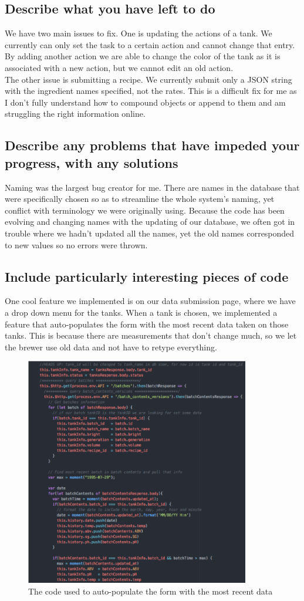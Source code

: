 \documentclass[draftclsnofoot,onecolumn,letterpaper,10pt,compsoc]{IEEEtran}
\begin{document}
\subsection{Describe what you have left to do}
We have two main issues to fix. One is updating the actions of a tank.
We currently can only set the task to a certain action and cannot change that entry.
By adding another action we are able to change the color of the tank as it is associated with a new action, but we cannot edit an old action.
\\
The other issue is submitting a recipe.
We currently submit only a JSON string with the ingredient names specified, not the rates.
This is a difficult fix for me as I don't fully understand how to compound objects or append to them and am struggling the right information online.
\subsection{Describe any problems that have impeded your progress, with any solutions}
Naming was the largest bug creator for me.
There are names in the database that were specifically chosen so as to streamline the whole system's naming, yet conflict with terminology we were originally using.
Because the code has been evolving and changing names with the updating of our database, we often got in trouble where we hadn't updated all the names, yet the old names corresponded to new values so no errors were thrown.
\subsection{Include particularly interesting pieces of code}
One cool feature we implemented is on our data submission page, where we have a drop down menu for the tanks.
When a tank is chosen, we implemented a feature that auto-populates the form with the most recent data taken on those tanks.
This is because there are measurements that don't change much, so we let the brewer use old data and not have to retype everything.
\begin{figure}
  \centering
  \includegraphics[height=10cm]{screenshots/lily/lilysCode.png}
  \caption{The code used to auto-populate the form with the most recent data}
\end{figure}
\end{document}
